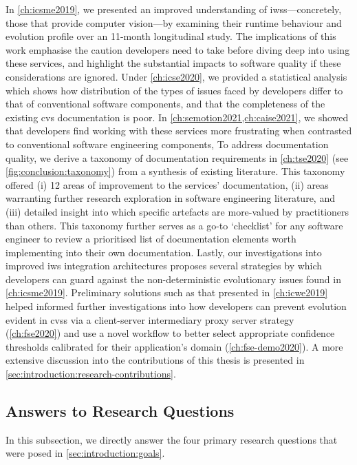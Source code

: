 In \cref{ch:icsme2019}, we presented an improved understanding of \glspl{iws}---concretely, those that provide computer vision---by examining their runtime behaviour and evolution profile over an 11-month longitudinal study. The implications of this work emphasise the caution developers need to take before diving deep into using these services, and highlight the substantial impacts to software quality if these considerations are ignored. Under \cref{ch:icse2020}, we provided a statistical analysis which shows how distribution of the types of issues faced by developers differ to that of conventional software components, and that the completeness of the existing \gls{cvs}  documentation is poor. In \cref{ch:semotion2021,ch:caise2021}, we showed that developers find working with these services more frustrating when contrasted to conventional software engineering components, To address documentation quality, we derive a taxonomy of  documentation requirements in \cref{ch:tse2020} (see \cref{fig:conclusion:taxonomy}) from a synthesis of existing literature. This taxonomy offered (i) 12 areas of improvement to the services' documentation, (ii) areas warranting further research exploration in software engineering literature, and (iii) detailed insight into which specific artefacts are more-valued by practitioners than others. This taxonomy further serves as a go-to `checklist' for any software engineer to review a prioritised list of documentation elements worth implementing into their own  documentation. Lastly, our investigations into improved \gls{iws} integration architectures proposes several strategies by which developers can guard against the non-deterministic evolutionary issues found in \cref{ch:icsme2019}. Preliminary solutions such as that presented in \cref{ch:icwe2019} helped informed further investigations into how developers can prevent evolution evident in \glspl{cvs} via a client-server intermediary proxy server strategy (\cref{ch:fse2020}) and use a novel workflow to better select appropriate confidence thresholds calibrated for their application's domain (\cref{ch:fse-demo2020}). A more extensive discussion into the contributions of this thesis is presented in \cref{sec:introduction:research-contributions}.

\subsection{Answers to Research Questions}

In this subsection, we directly answer the four primary research questions that were posed in \cref{sec:introduction:goals}.

